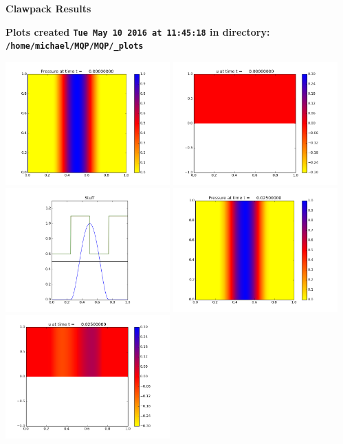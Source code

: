 \documentclass[11pt]{article}
\begin{document}
        \begin{center}{\Large\bf Clawpack Results}\vskip 5pt
        
        \bf Plots created {\tt Tue May 10 2016 at 11:45:18} in directory: \vskip 5pt
        \verb+/home/michael/MQP/MQP/_plots+
        \end{center}
        \vskip 5pt
        \includegraphics[width=0.475\textwidth]{frame0000fig0.png}
\includegraphics[width=0.475\textwidth]{frame0000fig1.png}
\vskip 10pt 
\includegraphics[width=0.475\textwidth]{frame0000fig3.png}
\vskip 10pt 
\includegraphics[width=0.475\textwidth]{frame0001fig0.png}
\includegraphics[width=0.475\textwidth]{frame0001fig1.png}
\end{document}

